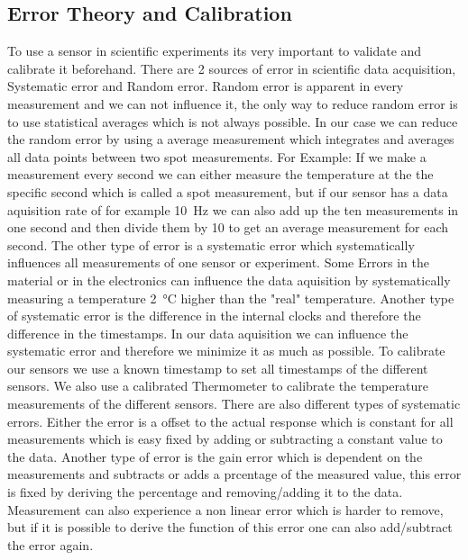 \subsection{Error Theory and Calibration}
To use a sensor in scientific experiments its very important to validate and calibrate it beforehand.
There are 2 sources of error in scientific data acquisition, Systematic error and Random error.
Random error is apparent in every measurement and we can not influence it, the only way to reduce random error is to use statistical averages which is not always possible. In our case we can reduce the random error by using a average measurement which integrates and averages all data points between two spot measurements.
For Example: If we make a measurement every second we can either measure the temperature at the the specific second which is called a spot measurement, but if our sensor has a data aquisition rate of for example \SI{10}{\hertz} we can also add up the ten measurements in one second and then divide them by 10 to get an average measurement for each second.
The other type of error is a systematic error which systematically influences all measurements of one sensor or experiment.
Some Errors in the material or in the electronics can influence the data aquisition by systematically measuring a temperature \SI{2}{\celsius} higher than the "real" temperature.
Another type of systematic error is the difference in the internal clocks and therefore the difference in the timestamps.
In our data aquisition we can influence the systematic error and therefore we minimize it as much as possible.
To calibrate our sensors we use a known timestamp to set all timestamps of the different sensors.
We also use a calibrated Thermometer to calibrate the temperature measurements of the different sensors.
There are also different types of systematic errors.
Either the error is a offset to the actual response which is constant for all measurements which is easy fixed by adding or subtracting a constant value to the data.
Another type of error is the gain error which is dependent on the measurements and subtracts or adds a prcentage of the measured value, this error is fixed by deriving the percentage and removing/adding it to the data.
Measurement can also experience a non linear error which is harder to remove, but if it is possible to derive the function of this error one can also add/subtract the error again.